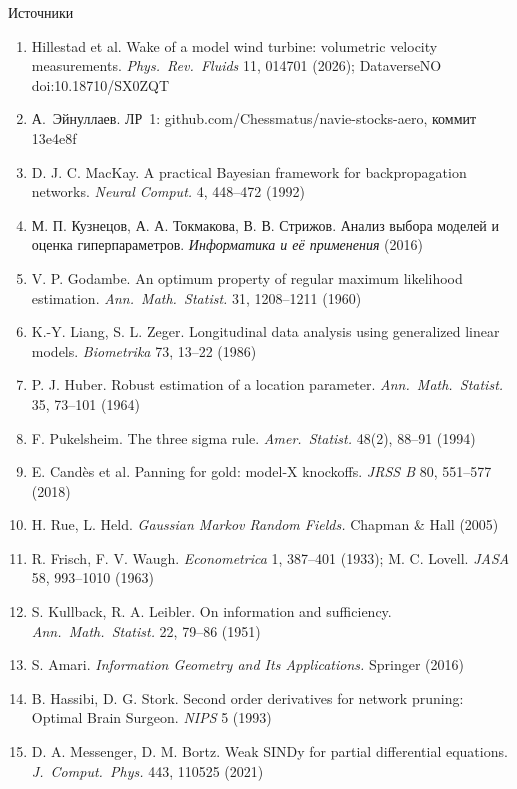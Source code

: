 \documentclass[11pt,aspectratio=43]{beamer}
\begin{document}
\begin{frame}{Источники}
  \tiny
  \begin{enumerate}
    \setlength{\itemsep}{0.1em}
    \item[{[1]}] Hillestad et al. Wake of a model wind turbine: volumetric velocity measurements. \emph{Phys.\ Rev.\ Fluids} 11, 014701 (2026); DataverseNO doi:10.18710/SX0ZQT
    \item[{[2]}] А.~Эйнуллаев. ЛР~1: github.com/Chessmatus/navie-stocks-aero, коммит 13e4e8f
    \item[{[3]}] D. J. C. MacKay. A practical Bayesian framework for backpropagation networks. \emph{Neural Comput.} 4, 448–472 (1992)
    \item[{[4]}] М. П. Кузнецов, А. А. Токмакова, В. В. Стрижов. Анализ выбора моделей и оценка гиперпараметров. \emph{Информатика и её применения} (2016)
    \item[{[5]}] V. P. Godambe. An optimum property of regular maximum likelihood estimation. \emph{Ann.\ Math.\ Statist.} 31, 1208–1211 (1960)
    \item[{[6]}] K.-Y. Liang, S. L. Zeger. Longitudinal data analysis using generalized linear models. \emph{Biometrika} 73, 13–22 (1986)
    \item[{[7]}] P. J. Huber. Robust estimation of a location parameter. \emph{Ann.\ Math.\ Statist.} 35, 73–101 (1964)
    \item[{[8]}] F. Pukelsheim. The three sigma rule. \emph{Amer.\ Statist.} 48(2), 88–91 (1994)
    \item[{[9]}] E. Candès et al. Panning for gold: model-X knockoffs. \emph{JRSS B} 80, 551–577 (2018)
    \item[{[10]}] H. Rue, L. Held. \emph{Gaussian Markov Random Fields.} Chapman \& Hall (2005)
    \item[{[11]}] R. Frisch, F. V. Waugh. \emph{Econometrica} 1, 387–401 (1933); M. C. Lovell. \emph{JASA} 58, 993–1010 (1963)
    \item[{[12]}] S. Kullback, R. A. Leibler. On information and sufficiency. \emph{Ann.\ Math.\ Statist.} 22, 79–86 (1951)
    \item[{[13]}] S. Amari. \emph{Information Geometry and Its Applications.} Springer (2016)
    \item[{[14]}] B. Hassibi, D. G. Stork. Second order derivatives for network pruning: Optimal Brain Surgeon. \emph{NIPS} 5 (1993)
    \item[{[15]}] D. A. Messenger, D. M. Bortz. Weak SINDy for partial differential equations. \emph{J.\ Comput.\ Phys.} 443, 110525 (2021)
  \end{enumerate}
\end{frame}
\end{document}
